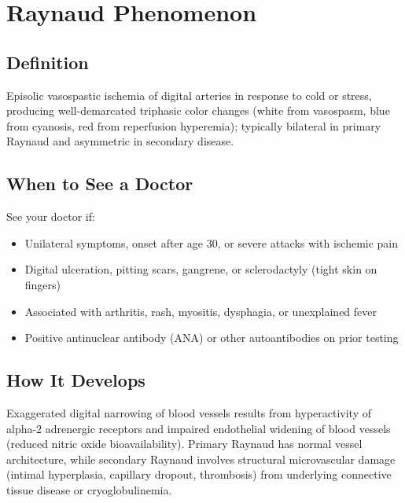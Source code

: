 \chapter{Raynaud Phenomenon}

\section*{Definition}
Episolic vasospastic ischemia of digital arteries in response to cold or stress, producing well-demarcated triphasic color changes (white from vasospasm, blue from cyanosis, red from reperfusion hyperemia); typically bilateral in primary Raynaud and asymmetric in secondary disease.

\section*{When to See a Doctor}
See your doctor if:
\begin{itemize}
  \item Unilateral symptoms, onset after age 30, or severe attacks with ischemic pain
  \item Digital ulceration, pitting scars, gangrene, or sclerodactyly (tight skin on fingers)
  \item Associated with arthritis, rash, myositis, dysphagia, or unexplained fever
  \item Positive antinuclear antibody (ANA) or other autoantibodies on prior testing
\end{itemize}

\section*{How It Develops}
Exaggerated digital narrowing of blood vessels results from hyperactivity of alpha-2 adrenergic receptors and impaired endothelial widening of blood vessels (reduced nitric oxide bioavailability). Primary Raynaud has normal vessel architecture, while secondary Raynaud involves structural microvascular damage (intimal hyperplasia, capillary dropout, thrombosis) from underlying connective tissue disease or cryoglobulinemia.

